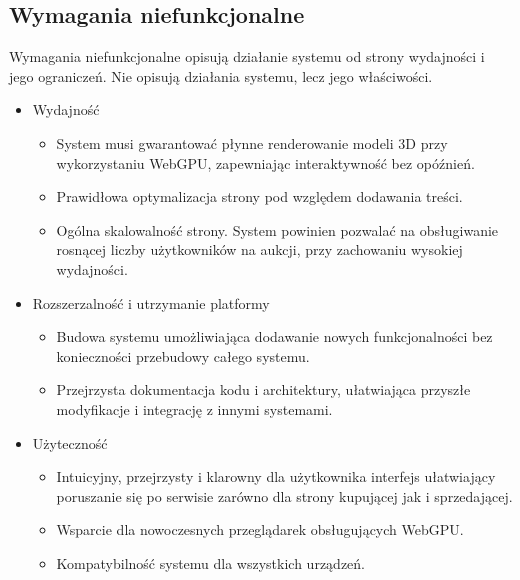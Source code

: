 \subsection{Wymagania niefunkcjonalne}
Wymagania niefunkcjonalne opisują działanie systemu od strony wydajności i jego ograniczeń. Nie opisują działania systemu, lecz jego właściwości.
\begin{itemize}
    \item Wydajność
          \begin{itemize}
              \item System musi gwarantować płynne renderowanie modeli 3D przy wykorzystaniu WebGPU, zapewniając interaktywność bez opóźnień.
              \item Prawidłowa optymalizacja strony pod względem dodawania treści.
              \item Ogólna skalowalność strony. System powinien pozwalać na obsługiwanie rosnącej liczby użytkowników na aukcji, przy zachowaniu wysokiej wydajności.
          \end{itemize}
\end{itemize}
\begin{itemize}
    \item Rozszerzalność i utrzymanie platformy
          \begin{itemize}
              \item Budowa systemu umożliwiająca dodawanie nowych funkcjonalności bez konieczności przebudowy całego systemu.
              \item Przejrzysta dokumentacja kodu i architektury, ułatwiająca przyszłe modyfikacje i integrację z innymi systemami.
          \end{itemize}
\end{itemize}
\begin{itemize}
    \item Użyteczność
          \begin{itemize}
              \item Intuicyjny, przejrzysty i klarowny dla użytkownika interfejs ułatwiający poruszanie się po serwisie zarówno dla strony kupującej jak i sprzedającej.
              \item Wsparcie dla nowoczesnych przeglądarek obsługujących WebGPU.
              \item Kompatybilność systemu dla wszystkich urządzeń.
          \end{itemize}
\end{itemize}

